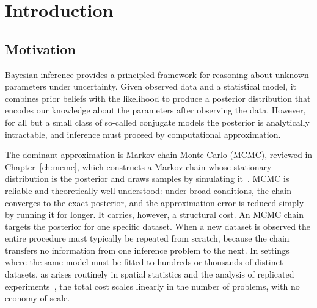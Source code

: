 \chapter{Introduction}
\label{ch:introduction}

\section{Motivation}
\label{sec:motivation}

Bayesian inference provides a principled framework for reasoning about
unknown parameters under uncertainty. Given observed data and a
statistical model, it combines prior beliefs with the likelihood to
produce a posterior distribution that encodes our knowledge about
the parameters after observing the data. However, for all but a small class of so-called conjugate models the posterior is analytically intractable, and
inference must proceed by computational approximation.

The dominant approximation is Markov chain Monte Carlo (MCMC), reviewed in Chapter~\ref{ch:mcmc}, which
constructs a Markov chain whose stationary distribution is the
posterior and draws samples by simulating it~\citep{brooks2011handbook, robert2004monte}. MCMC is reliable and
theoretically well understood: under broad conditions, the chain converges to the exact
posterior, and the approximation error is reduced simply by running it
for longer. It carries, however, a structural cost. An MCMC chain
targets the posterior for one specific dataset. When a new dataset is
observed the entire procedure must typically be repeated from scratch, because
the chain transfers no information from one inference problem to the
next. In settings where the same model must be fitted to hundreds or
thousands of distinct datasets, as arises routinely in spatial
statistics and the analysis of replicated
experiments~\citep{sainsburydale2024nbe, sainsburydale2025graph}, the total cost scales linearly in the number of
problems, with no economy of scale.

